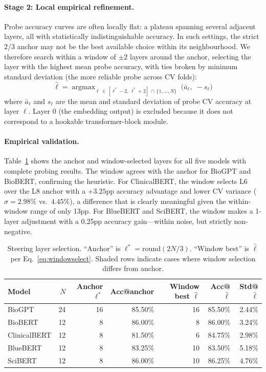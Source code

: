 \documentclass[11pt,a4paper]{article}
\begin{document}
\paragraph{Stage 2: Local empirical refinement.}
Probe accuracy curves are often locally flat: a plateau spanning several
adjacent layers, all with statistically indistinguishable accuracy. In
such settings, the strict 2/3 anchor may not be the best available
choice within its neighbourhood. We therefore search within a window of
$\pm 2$ layers around the anchor, selecting the layer with the highest
mean probe accuracy, with ties broken by minimum standard deviation (the
more reliable probe across CV folds):
\begin{equation}
\hat{\ell} = \mathop{\mathrm{argmax}}_{\ell \,\in\,
  [\ell^* - 2,\, \ell^* + 2] \,\cap\, \{1,\ldots,N\}}
  \;\bigl(\bar{a}_\ell,\; -s_\ell\bigr)
\label{eq:windowselect}
\end{equation}
where $\bar{a}_\ell$ and $s_\ell$ are the mean and standard deviation
of probe CV accuracy at layer $\ell$. Layer 0 (the embedding output) is
excluded because it does not correspond to a hookable transformer-block
module.

\paragraph{Empirical validation.}
Table~\ref{tab:layerselect} shows the anchor and window-selected layers
for all five models with complete probing results. The window agrees with
the anchor for BioGPT and BioBERT, confirming the heuristic. For
ClinicalBERT, the window selects L6 over the L8 anchor with a
$+3.25$pp accuracy advantage and lower CV variance
($\sigma = 2.98\%$ vs.\ $4.45\%$), a difference that is clearly
meaningful given the within-window range of only 13pp. For BlueBERT and
SciBERT, the window makes a 1-layer adjustment with a 0.25pp accuracy
gain---within noise, but strictly non-negative.

\begin{table}[ht]
\centering
\caption{Steering layer selection. ``Anchor'' is $\ell^* = \mathrm{round}(2N/3)$.
  ``Window best'' is $\hat{\ell}$ per Eq.~\eqref{eq:windowselect}.
  Shaded rows indicate cases where window selection differs from anchor.}
\label{tab:layerselect}
\begin{tabular}{lrrrrrr}
\toprule
\textbf{Model} & $N$ & \textbf{Anchor} $\ell^*$ &
  \textbf{Acc@anchor} & \textbf{Window best} $\hat{\ell}$ &
  \textbf{Acc@}$\hat{\ell}$ & \textbf{Std@}$\hat{\ell}$ \\
\midrule
BioGPT       & 24 & 16 & 85.50\% & 16 & 85.50\% & 2.44\% \\
BioBERT      & 12 &  8 & 86.00\% &  8 & 86.00\% & 3.24\% \\
\rowcolor{gray!15}
ClinicalBERT & 12 &  8 & 81.50\% &  6 & 84.75\% & 2.98\% \\
\rowcolor{gray!15}
BlueBERT     & 12 &  8 & 83.25\% & 10 & 83.50\% & 5.18\% \\
\rowcolor{gray!15}
SciBERT      & 12 &  8 & 86.00\% & 10 & 86.25\% & 4.76\% \\
\bottomrule
\end{tabular}
\end{table}
\end{document}
